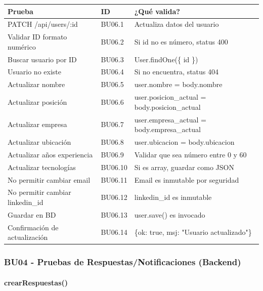 \begin{table}[H]
\centering
\begin{tabular}{|l|l|p{6cm}|}
\hline
\textbf{Prueba} & \textbf{ID} & \textbf{¿Qué valida?} \\ \hline
PATCH /api/users/:id & BU06.1 & Actualiza datos del usuario \\ \hline
Validar ID formato numérico & BU06.2 & Si id no es número, status 400 \\ \hline
Buscar usuario por ID & BU06.3 & User.findOne(\{ id \}) \\ \hline
Usuario no existe & BU06.4 & Si no encuentra, status 404 \\ \hline
Actualizar nombre & BU06.5 & user.nombre = body.nombre \\ \hline
Actualizar posición & BU06.6 & user.posicion\_actual = body.posicion\_actual \\ \hline
Actualizar empresa & BU06.7 & user.empresa\_actual = body.empresa\_actual \\ \hline
Actualizar ubicación & BU06.8 & user.ubicacion = body.ubicacion \\ \hline
Actualizar años experiencia & BU06.9 & Validar que sea número entre 0 y 60 \\ \hline
Actualizar tecnologías & BU06.10 & Si es array, guardar como JSON \\ \hline
No permitir cambiar email & BU06.11 & Email es inmutable por seguridad \\ \hline
No permitir cambiar linkedin\_id & BU06.12 & linkedin\_id es inmutable \\ \hline
Guardar en BD & BU06.13 & user.save() es invocado \\ \hline
Confirmación de actualización & BU06.14 & \{ok: true, msj: "Usuario actualizado"\} \\ \hline
\end{tabular}
\end{table}

\subsubsection{BU04 - Pruebas de Respuestas/Notificaciones (Backend)}

\paragraph{crearRespuestas()}

